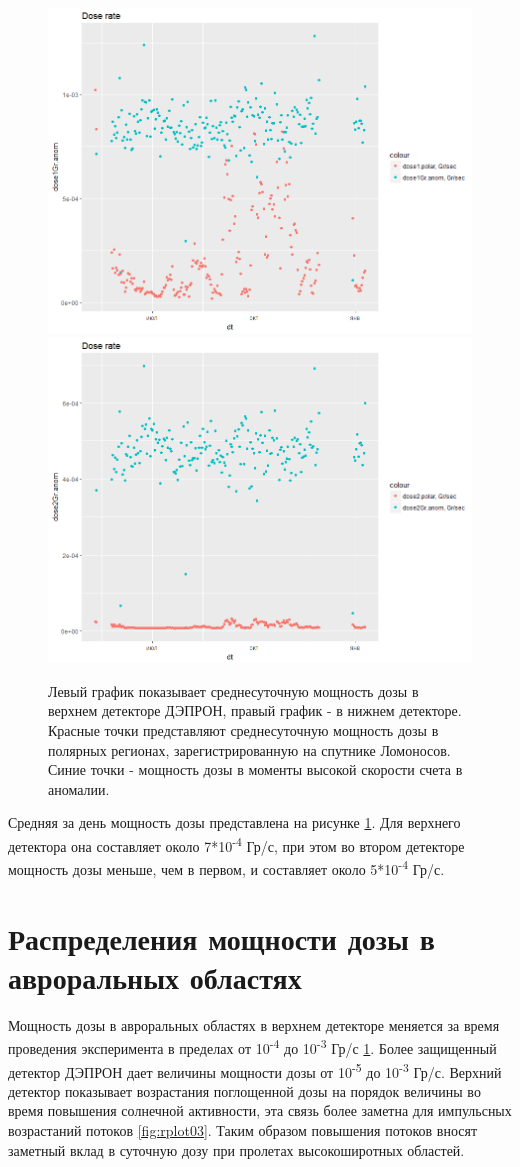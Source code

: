 \begin{figure}
	\centering
	\includegraphics[width=0.49\linewidth]{images/doseanalisys/det1}
	\includegraphics[width=0.49\linewidth]{images/doseanalisys/det2}
	\caption{ Левый график показывает среднесуточную мощность дозы в верхнем детекторе ДЭПРОН, правый график - в нижнем детекторе. Красные точки представляют среднесуточную мощность дозы в полярных регионах, зарегистрированную на спутнике Ломоносов. Синие точки - мощность дозы в моменты высокой скорости счета в аномалии.}
	\label{fig:doseanom}
\end{figure}

Средняя за день мощность дозы  представлена на рисунке \ref{fig:doseanom}. Для верхнего детектора она составляет около 7*10\textsuperscript{-4} Гр/с, при этом во втором детекторе мощность дозы меньше, чем в первом,  и составляет около 5*10\textsuperscript{-4} Гр/с. 

\section{Распределения мощности дозы в авроральных областях}

Мощность дозы в авроральных областях  в верхнем детекторе меняется за время проведения эксперимента в пределах от 10\textsuperscript{-4}  до 10\textsuperscript{-3} Гр/с  \ref{fig:doseanom}. Более защищенный детектор ДЭПРОН дает величины мощности дозы от  10\textsuperscript{-5}  до 10\textsuperscript{-3} Гр/с. Верхний детектор показывает возрастания поглощенной дозы на порядок величины во время повышения солнечной активности, эта связь более заметна для импульсных возрастаний потоков \ref{fig:rplot03}. Таким образом повышения потоков вносят заметный вклад в суточную дозу при пролетах высокоширотных областей.

